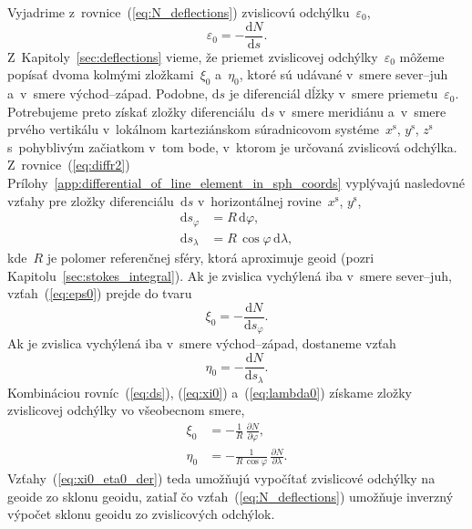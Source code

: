 \documentclass[a4paper, 12pt]{book}
\newcommand{\diff}{\mathrm d}
\begin{document}
Vyjadrime z~rovnice~(\ref{eq:N_deflections}) zvislicovú 
odchýlku~$\varepsilon_0$,
%
\begin{equation}
\label{eq:eps0}
\varepsilon_0 = -\frac{\diff N}{\diff s}{.}
\end{equation}
%
Z~Kapitoly~\ref{sec:deflections} vieme, že priemet zvislicovej 
odchýlky~$\varepsilon_0$ môžeme popísať dvoma kolmými zložkami~$\xi_0$ 
a~$\eta_0$, ktoré sú udávané v~smere sever--juh a~v~smere východ--západ.  
Podobne, $\diff s$ je diferenciál dĺžky v~smere priemetu~$\varepsilon_0$.  
Potrebujeme preto získať zložky diferenciálu~$\diff s$ v~smere meridiánu 
a~v~smere prvého vertikálu v~lokálnom karteziánskom súradnicovom 
systéme~$x^\mathrm{s}$, $y^\mathrm{s}$, $z^\mathrm{s}$ s~pohyblivým začiatkom 
v~tom bode, v~ktorom je určovaná zvislicová odchýlka.  
Z~rovnice~(\ref{eq:diffr2}) 
Prílohy~\ref{app:differential_of_line_element_in_sph_coords} vyplývajú 
nasledovné vzťahy pre zložky diferenciálu~$\diff s$ v~horizontálnej 
rovine~$x^\mathrm{s}$, $y^\mathrm{s}$,
%
\begin{equation}
\label{eq:ds}
\begin{split}
\diff s_\varphi &= R \, \diff \varphi{,}\\
%
\diff s_\lambda &= R \, \cos\varphi \, \diff \lambda{,}
\end{split}
\end{equation}
%
kde~$R$ je polomer referenčnej sféry, ktorá aproximuje geoid (pozri 
Kapitolu~\ref{sec:stokes_integral}).  Ak je zvislica vychýlená iba v~smere 
sever--juh, vzťah~(\ref{eq:eps0}) prejde do tvaru
%
\begin{equation}
\label{eq:xi0}
\xi_0 = -\frac{\diff N}{\diff s_\varphi}{.}
\end{equation}
%
Ak je zvislica vychýlená iba v~smere východ--západ, dostaneme vzťah
%
\begin{equation}
\label{eq:lambda0}
\eta_0 = -\frac{\diff N}{\diff s_\lambda}{.}
\end{equation}
%
Kombináciou rovníc~(\ref{eq:ds}), (\ref{eq:xi0}) a~(\ref{eq:lambda0}) získame 
zložky zvislicovej odchýlky vo všeobecnom smere,
%
\begin{equation}
\begin{split}
\label{eq:xi0_eta0_der}
\xi_0 &= -\frac{1}{R} \, \frac{\partial N}{\partial \varphi}{,}\\
%
\eta_0 &= -\frac{1}{R \, \cos\varphi} \, \frac{\partial N}{\partial \lambda}{.}
\end{split}
\end{equation}
%
Vzťahy~(\ref{eq:xi0_eta0_der}) teda umožňujú vypočítať zvislicové odchýlky na 
geoide zo sklonu geoidu, zatiaľ čo vzťah~(\ref{eq:N_deflections}) umožňuje 
inverzný výpočet sklonu geoidu zo zvislicových odchýlok.
\end{document}
